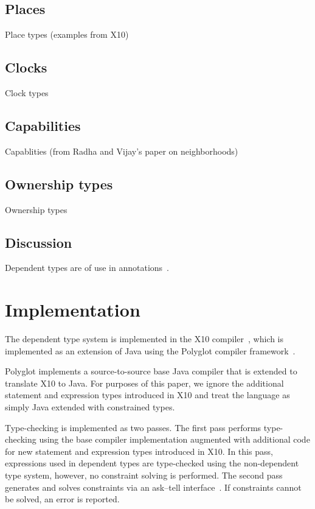 \documentclass[nocopyrightspace,preprint,9pt]{sigplanconf}
\begin{document}
\cite{gps06-arrays}

\subsection{Places}

Place types (examples from X10)

\subsection{Clocks}

Clock types

\subsection{Capabilities}

Capablities (from Radha and Vijay's paper on neighborhoods)

\subsection{Ownership types}

Ownership types~\cite{ownership-types}

\subsection{Discussion}

Dependent types are of use in annotations~\cite{ns07-x10anno}.

\section{Implementation}
\label{sec:implementation}

%

The dependent type system is implemented in the X10
compiler~\cite{X10}, which is implemented as an extension of
Java using the Polyglot compiler framework~\cite{ncm03}.

Polyglot implements a source-to-source base Java compiler 
that is extended to translate X10 to Java.  For purposes of this
paper, we ignore the additional statement and expression types
introduced in X10 and treat the language as simply Java
extended with constrained types.

Type-checking is implemented as two passes.  The first pass
performs type-checking using the base compiler implementation
augmented with additional code for new statement and expression
types introduced in X10. In this pass, expressions used in
dependent types are type-checked using the non-dependent type
system, however, no constraint solving is performed.
The second pass generates and solves constraints via an
ask--tell interface~\cite{my-thesis-book}.
If constraints cannot be solved, an error is reported.
\end{document}
